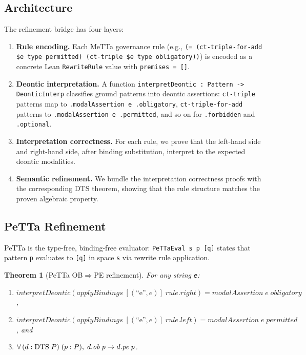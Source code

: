 \documentclass[]{article}
\newtheorem{theorem}{Theorem}
\newcommand{\code}[1]{\texttt{#1}}
\newcommand{\DTS}{\textup{DTS}}
\begin{document}
\subsection{Architecture}

The refinement bridge has four layers:

\begin{enumerate}
\item \textbf{Rule encoding.} Each MeTTa governance rule (e.g.,
      \code{(= (ct-triple-for-add \$e type permitted) (ct-triple \$e type obligatory))})
      is encoded as a concrete Lean \code{RewriteRule} value with
      \code{premises = []}.
\item \textbf{Deontic interpretation.} A function
      \code{interpretDeontic : Pattern -> DeonticInterp}
      classifies ground patterns into deontic assertions:
      \code{ct-triple} patterns map to \code{.modalAssertion e .obligatory},
      \code{ct-triple-for-add} patterns to \code{.modalAssertion e .permitted},
      and so on for \code{.forbidden} and \code{.optional}.
\item \textbf{Interpretation correctness.} For each rule, we prove that
      the left-hand side and right-hand side, after binding substitution,
      interpret to the expected deontic modalities.
\item \textbf{Semantic refinement.} We bundle the interpretation correctness
      proofs with the corresponding \DTS{} theorem, showing that the rule
      structure matches the proven algebraic property.
\end{enumerate}

\subsection{PeTTa Refinement}

PeTTa is the type-free, binding-free evaluator: \code{PeTTaEval s p [q]} states
that pattern \code{p} evaluates to \code{[q]} in space \code{s} via rewrite
rule application.

\begin{theorem}[PeTTa OB$\Rightarrow$PE refinement]
\label{thm:petta-ob-pe}
For any string \code{e}:
\begin{enumerate}
\item $\mathit{interpretDeontic}(\mathit{applyBindings}\;[(\text{``e''}, e)]\;\mathit{rule.right})
       = \mathit{modalAssertion}\; e\; \mathit{obligatory}$,
\item $\mathit{interpretDeontic}(\mathit{applyBindings}\;[(\text{``e''}, e)]\;\mathit{rule.left})
       = \mathit{modalAssertion}\; e\; \mathit{permitted}$, and
\item $\forall\, (d : \DTS{}\;P)\;(p : P),\; d.\mathit{ob}\;p \to d.\mathit{pe}\;p$.
\end{enumerate}
\end{theorem}
\end{document}
